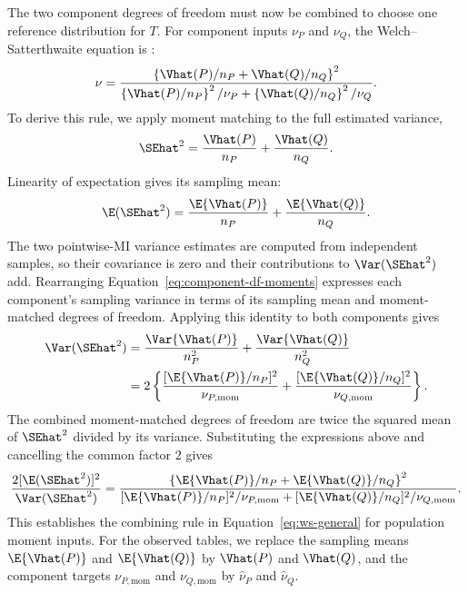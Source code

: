 The two component degrees of freedom must now be combined to choose one
reference distribution for \(T\). For component inputs \(\nu_P\) and
\(\nu_Q\), the Welch--Satterthwaite equation is
\citep{satterthwaite1946,welch1947}:
\begin{equation}
  \nu
  =
  \frac{
  \left\{\Vhat(P)/n_P+\Vhat(Q)/n_Q\right\}^2
  }{
  \left\{\Vhat(P)/n_P\right\}^2/\nu_P
  +\left\{\Vhat(Q)/n_Q\right\}^2/\nu_Q
  }.
  \label{eq:ws-general}
\end{equation}
To derive this rule, we apply moment matching to the full estimated
variance,
\begin{equation*}
  \SEhat^2=\frac{\Vhat(P)}{n_P}+\frac{\Vhat(Q)}{n_Q}.
\end{equation*}
Linearity of expectation gives its sampling mean:
\begin{equation*}
  \E(\SEhat^2)
  =\frac{\E\{\Vhat(P)\}}{n_P}
   +\frac{\E\{\Vhat(Q)\}}{n_Q}.
\end{equation*}
The two pointwise-MI variance estimates are computed from independent
samples, so their covariance is zero and their contributions to
\(\Var(\SEhat^2)\) add. Rearranging
Equation~\eqref{eq:component-df-moments} expresses each component's sampling
variance in terms of its sampling mean and moment-matched degrees of
freedom. Applying this identity to both components gives
\begin{align*}
  \Var(\SEhat^2)
  &=\frac{\Var\{\Vhat(P)\}}{n_P^2}
    +\frac{\Var\{\Vhat(Q)\}}{n_Q^2}\\*
  &=2\left\{
    \frac{[\E\{\Vhat(P)\}/n_P]^2}{\nu_{P,\mathrm{mom}}}
    +\frac{[\E\{\Vhat(Q)\}/n_Q]^2}{\nu_{Q,\mathrm{mom}}}
    \right\}.
\end{align*}
The combined moment-matched degrees of freedom are twice the squared mean
of \(\SEhat^2\) divided by its variance. Substituting the expressions above
and cancelling the common factor \(2\) gives
\begin{equation*}
  \frac{2[\E(\SEhat^2)]^2}{\Var(\SEhat^2)}
  =\frac{
    \left\{\E\{\Vhat(P)\}/n_P+\E\{\Vhat(Q)\}/n_Q\right\}^2
    }{
    [\E\{\Vhat(P)\}/n_P]^2/\nu_{P,\mathrm{mom}}
    +[\E\{\Vhat(Q)\}/n_Q]^2/\nu_{Q,\mathrm{mom}}
    }.
\end{equation*}
This establishes the combining rule in Equation~\eqref{eq:ws-general} for
population moment inputs. For the observed tables, we replace the sampling
means \(\E\{\Vhat(P)\}\) and \(\E\{\Vhat(Q)\}\) by \(\Vhat(P)\) and
\(\Vhat(Q)\), and the component targets \(\nu_{P,\mathrm{mom}}\) and
\(\nu_{Q,\mathrm{mom}}\) by \(\widehat\nu_P\) and \(\widehat\nu_Q\).
